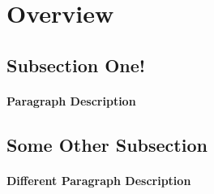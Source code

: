 \section{Overview}

\subsection{Subsection One!}

\lipsum[6] %

\paragraph{Paragraph Description} \lipsum[7] %

\subsection{Some Other Subsection}
\paragraph{Different Paragraph Description} \lipsum[8] %
